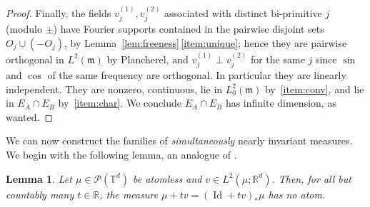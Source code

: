 \documentclass[11pt,reqno]{amsart}
\theoremstyle{plain}
\newtheorem{lem}[thm]{Lemma}
\theoremstyle{definition}
\newcommand{\T}{\mathbb{T}}
\newcommand{\R}{\mathbb{R}}
\newcommand{\Leb}{\mathfrak{m}}
\newcommand{\Prob}{\mathcal{P}}
\DeclareMathOperator{\Id}{Id}
\begin{document}
\begin{proof}
    Finally, the fields \( v_j^{(1)},v_j^{(2)} \) associated with distinct bi-primitive \( j \) (modulo \( \pm \)) have Fourier supports contained in the pairwise disjoint sets \( O_j\cup(-O_j) \), by Lemma~\ref{lem:freeness}\,\ref{item:unique}; hence they are pairwise orthogonal in \( L^2(\Leb) \) by Plancherel, and \( v_j^{(1)}\perp v_j^{(2)} \) for the same \( j \) since \( \sin \) and \( \cos \) of the same frequency are orthogonal.
    In particular they are linearly independent.
    They are nonzero, continuous, lie in \( L^2_0(\Leb) \) by~\ref{item:conv}, and lie in \( E_A\cap E_B \) by~\ref{item:char}.
    We conclude \( E_A\cap E_B \) has infinite dimension, as wanted.
\end{proof}


We can now construct the families of \emph{simultaneously} nearly invariant measures.
We begin with the following lemma, an analogue of \cite[Proposition 1.5]{kloeckner_optimal_2013}.

\begin{lem}
    \label{lem:atomless}
    Let \( \mu\in \Prob(\T^d) \) be atomless and \( v\in L^2(\mu;\R^d) \).
    Then, for all but countably many \( t\in\R \), the measure \( \mu+tv=(\Id+tv)_\ast \mu \) has no atom.
\end{lem}
\end{document}
